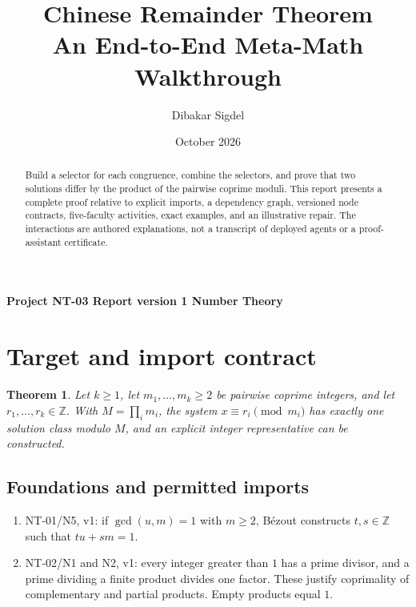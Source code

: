 \documentclass[preprint,12pt,aps,pra,showkeys,amsmath,amssymb,superscriptaddress,floatfix]{revtex4-2}
\newtheorem{theorem}{Theorem}[section]
\theoremstyle{definition}
\theoremstyle{remark}
\begin{document}
\title{Chinese Remainder Theorem\\[4pt]\large An End-to-End Meta-Math Walkthrough}

\author{Dibakar Sigdel}


\date{October 2026}

\begin{abstract}

Build a selector for each congruence, combine the selectors, and prove
that two solutions differ by the product of the pairwise coprime moduli.
This report presents a complete proof relative to explicit imports, a
dependency graph, versioned node contracts, five-faculty activities,
exact examples, and an illustrative repair. The interactions are
authored explanations, not a transcript of deployed agents or a
proof-assistant certificate.

\end{abstract}

\maketitle

\linespread{1.12}\selectfont

\noindent\textbf{Project NT-03 \quad Report version 1 \quad Number Theory}

\section{Target and import contract}

\begin{theorem}

Let \(k\ge1\), let \(m_1,\ldots,m_k\ge2\) be pairwise coprime integers,
and let \(r_1,\ldots,r_k\in\mathbb Z\). With \(M=\prod_i m_i\), the
system \(x\equiv r_i\pmod{m_i}\) has exactly one solution class modulo
\(M\), and an explicit integer representative can be constructed.

\end{theorem}

\subsection{Foundations and permitted imports}

\begin{enumerate}
\def\labelenumi{\arabic{enumi}.}
\item
  NT-01/N5, v1: if \(\gcd(u,m)=1\) with \(m\ge2\), Bézout constructs
  \(t,s\in\mathbb Z\) such that \(tu+sm=1\).
\item
  NT-02/N1 and N2, v1: every integer greater than \(1\) has a prime
  divisor, and a prime dividing a finite product divides one factor.
  These justify coprimality of complementary and partial products. Empty
  products equal \(1\).
\end{enumerate}
\end{document}
